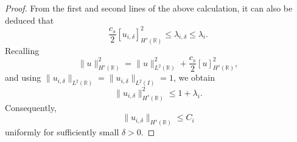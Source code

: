 \documentclass[preprint,12pt]{elsarticle}
\newcommand{\R}{\mathbb R}
\begin{document}
{\begin{proof}

From the first and second lines of the above calculation, it can also be deduced that
\[
    \frac{c_s}{2}
    [u_{i,\delta}]_{H^s(\R)}^2
    \leq
    \lambda_{i,\delta}
    \leq
    \lambda_i.
\]
Recalling
\[
    \|u\|_{H^s(\R)}^2
    =
    \|u\|_{L^2(\R)}^2
    +
    \frac{c_s}{2}[u]_{H^s(\R)}^2,
\]
and using $\|u_{i,\delta}\|_{L^2(\R)}
=\|u_{i,\delta}\|_{L^2(I)}=1$, we obtain
\[
    \|u_{i,\delta}\|_{H^s(\R)}^2
    \leq 1+\lambda_i.
\]
Consequently,
\[
    \|u_{i,\delta}\|_{H^s(\R)}
    \leq C_i
\]
uniformly for sufficiently small $\delta>0$.





\end{proof}}
\end{document}
